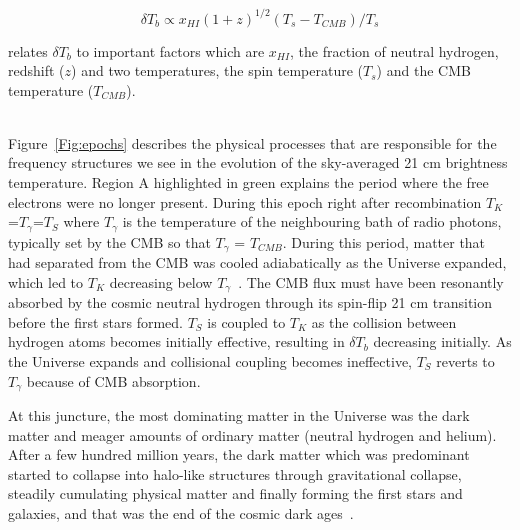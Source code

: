 	\begin{equation}
	\delta{T_b}\propto {x_{HI}}(1+z)^{1/2}({T_s}-{T_{CMB}})/{T_s}
	\end{equation}
	
	relates $\delta$$T_b$ to important factors which are \(x_{HI}\), the fraction of neutral hydrogen, redshift ($z$) and two temperatures, the spin temperature ($T_s$) and the CMB temperature ($T_{CMB}$).
	
	 \\
	
	Figure~\ref{Fig:epochs} describes the physical processes that are responsible for the frequency structures we see in the evolution of the sky-averaged 21 cm brightness temperature. Region A highlighted in green explains the period where the free electrons were no longer present. During this epoch right after recombination $T_K$=$T_\gamma$=$T_S$ where $T_\gamma$ is the temperature of the neighbouring bath of radio photons, typically set by the CMB so that $T_\gamma$ = $T_{CMB}$. During this period, matter that had separated from the CMB was cooled adiabatically as the Universe expanded, which led to $T_K$ decreasing below $T_\gamma$~\citep{2006PhR...433..181F}. The CMB flux must have been resonantly absorbed by the cosmic neutral hydrogen through its spin-flip 21 cm transition before the first stars formed. $T_S$ is coupled to $T_K$ as the collision between hydrogen atoms becomes initially effective, resulting in $\delta T_b$ decreasing initially. As the Universe expands and collisional coupling becomes ineffective, $T_S$ reverts to $T_\gamma$ because of CMB absorption.
	
	At this juncture, the most dominating matter in the Universe was the dark matter and meager amounts of ordinary matter (neutral hydrogen and helium). After a few hundred million years, the dark matter which was predominant started to collapse into halo-like structures through gravitational collapse, steadily cumulating physical matter and finally forming the first stars and galaxies, and that was the end of the cosmic dark ages~\citep{2003Sci...300.1904M}.
	
	
